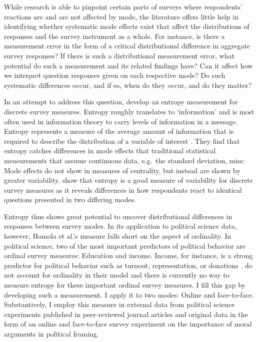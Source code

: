 \documentclass[12pt,]{article}
\begin{document}
While research is able to pinpoint certain parts of surveys where
respondents' reactions are and are not affected by mode, the literature
offers little help in identifying whether systematic mode effects exist
that affect the distributions of responses and the survey instrument as
a whole. For instance, is there a measurement error in the form of a
critical distributional difference in aggregate survey responses? If
there is such a distributional measurement error, what potential do such
a measurement and its related findings have? Can it affect how we
interpret question responses given on each respective mode? Do such
systematic differences occur, and if so, when do they occur, and do they
matter?

In an attempt to address this question, \citet{homola_2016_measure}
develop an entropy measurement \citep{shannon_1948_mathematical} for
discrete survey measures. Entropy roughly translates to `information'
and is most often used in information theory to carry levels of
information in a message. Entropy represents a measure of the average
amount of information that is required to describe the distribution of a
variable of interest \citep{cover_1991_elements}. They find that entropy
catches differences in mode effects that traditional statistical
measurements that assume continuous data, e.g.~the standard deviation,
miss: Mode effects do not show in measures of centrality, but instead
are shown by greater variability. \citet{homola_2016_measure} show that
entropy is a good measure of variability for discrete survey measures as
it reveals differences in how respondents react to identical questions
presented in two differing modes.

Entropy thus shows great potential to uncover distributional differences
in responses between survey modes. In its application to political
science data, however, Homola et al.'s measure falls short on the aspect
of ordinality. In political science, two of the most important
predictors of political behavior are ordinal survey measures: Education
and income. Income, for instance, is a strong predictor for political
behavior such as turnout, representation, or donations
\citep{dawood_campaign_2015, fiorina_disconnect_2009, leighley_who_2014}.
\citet{homola_2016_measure} do not account for ordinality in their model
and there is currently no way to measure entropy for these important
ordinal survey measures. I fill this gap by developing such a
measurement. I apply it to two modes: Online and face-to-face.
Substantively, I employ this measure in external data from political
science experiments published in peer-reviewed journal articles and
original data in the form of an online and face-to-face survey
experiment on the importance of moral arguments in political framing.
\end{document}
